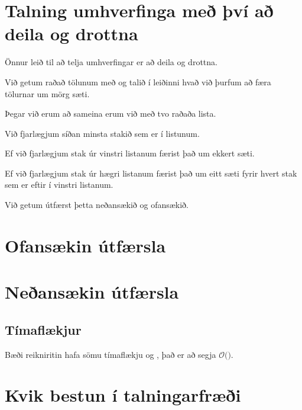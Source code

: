 \section{Talning umhverfinga með því að deila og drottna}
{
    {
        \item<1-> Önnur leið til að telja umhverfingar er að deila og drottna.
        \item<2-> Við getum raðað tölunum með  og talið í leiðinni hvað við þurfum að færa tölurnar um mörg sæti.
        \item<3-> Þegar við erum að sameina erum við með tvo raðaða lista.
        \item<4-> Við fjarlægjum síðan minsta stakið sem er í listunum.
        \item<5-> Ef við fjarlægjum stak úr vinstri listanum færist það um ekkert sæti.
        \item<6-> Ef við fjarlægjum stak úr hægri listanum færist það um eitt sæti fyrir hvert stak sem er eftir í vinstri listanum.
        \item<7-> Við getum útfærst þetta neðansækið og ofansækið.
    }
}

\section{Ofansækin útfærsla}
{
}

\section{Neðansækin útfærsla}
{
}

\subsection{Tímaflækjur}
{
    {
        \item<1-> Bæði reikniritin hafa sömu tímaflækju og , það er að segja $\mathcal{O}($$)$.
    }
}

\section{Kvik bestun í talningarfræði}

